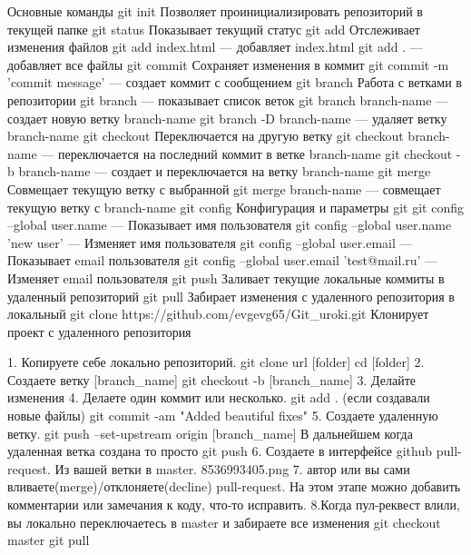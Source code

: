
Основные команды
git init
Позволяет проинициализировать репозиторий в текущей папке
git status
Показывает текущий статус
git add
Отслеживает изменения файлов
git add index.html — добавляет index.html
git add . — добавляет все файлы
git commit
Сохраняет изменения в коммит
git commit -m 'commit message' — создает коммит с сообщением
git branch
Работа с ветками в репозитории
git branch — показывает список веток
git branch branch-name — создает новую ветку branch-name
git branch -D branch-name — удаляет ветку branch-name
git checkout
Переключается на другую ветку
git checkout branch-name — переключается на последний коммит в ветке
branch-name
git checkout -b branch-name — создает и переключается на ветку branch-name
git merge
Совмещает текущую ветку с выбранной
git merge branch-name — совмещает текущую ветку с branch-name
git config
Конфигурация и параметры git
git config --global user.name — Показывает имя пользователя
git config --global user.name 'new user' — Изменяет имя пользователя
git config --global user.email — Показывает email пользователя
git config --global user.email 'test@mail.ru' — Изменяет email пользователя
git push
Заливает текущие локальные коммиты в удаленный репозиторий
git pull
Забирает изменения с удаленного репозитория в локальный
git clone https://github.com/evgevg65/Git_uroki.git
Клонирует проект с удаленного репозитория




1. Копируете себе локально репозиторий.
git clone url [folder]
cd [folder]
2. Создаете ветку [branch_name]
git checkout -b [branch_name]
3. Делайте изменения
4. Делаете один коммит или несколько.
git add . (если создавали новые файлы)
git commit -am "Added beautiful fixes"
5. Создаете удаленную ветку.
git push --set-upstream origin [branch_name]
В дальнейшем когда удаленная ветка создана то просто
git push
6. Создаете в интерфейсе github pull-request. Из вашей ветки в master.
8536993405.png
7. автор или вы сами вливаете(merge)/отклоняете(decline) pull-request.
На этом этапе можно добавить комментарии или замечания к коду, что-то исправить.
8.Когда пул-реквест влили, вы локально переключаетесь в master и забираете все изменения
git checkout master
git pull
